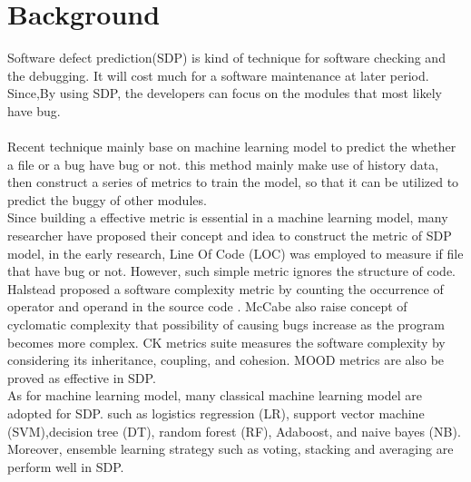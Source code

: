 \documentclass{article}
\begin{document}
\section{Background}
Software defect prediction(SDP) is kind of technique for software checking and the debugging. It will cost much for a software maintenance at later period. Since,By using SDP, the developers can focus on the modules that most likely have bug.\\
\\
Recent technique mainly base on machine learning model to predict the whether a file or a bug have bug or not. this method mainly make use of history data, then construct a series of metrics to train the model, so that it can be utilized to predict the buggy of other modules.\\

Since building a effective metric is essential in a machine learning model, many researcher have proposed their concept and idea to construct the metric of SDP model, in the early research, Line Of Code (LOC)\cite{} was employed to measure if file that have bug or not. However, such simple metric ignores the structure of code. Halstead proposed a software complexity metric by counting the occurrence of operator and operand in the source code \cite{}. McCabe also raise concept of cyclomatic complexity that possibility of causing bugs increase as the program becomes more complex\cite{}. CK metrics suite measures the software complexity by considering its inheritance, coupling, and cohesion. MOOD metrics are also be proved as effective in SDP. \\

As for machine learning model, many classical machine learning model are adopted for SDP. such as logistics regression (LR), support vector machine (SVM),decision tree (DT), random forest (RF), Adaboost, and naive bayes (NB). Moreover, ensemble learning strategy such as voting, stacking and averaging are perform well in SDP. 
\end{document}
